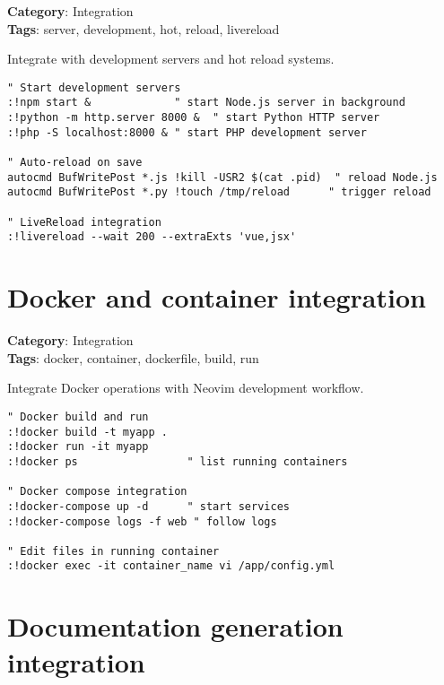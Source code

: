 {{{{{{\textbf{Category}: Integration\\ \textbf{Tags}: server, development, hot, reload, livereload
\vspace{0.5cm}

Integrate with development servers and hot reload systems.

\begin{Exa*}{}
\begin{Verbatim}[fontsize=\footnotesize, breaklines, breakanywhere]
" Start development servers
:!npm start &             " start Node.js server in background
:!python -m http.server 8000 &  " start Python HTTP server
:!php -S localhost:8000 & " start PHP development server

" Auto-reload on save
autocmd BufWritePost *.js !kill -USR2 $(cat .pid)  " reload Node.js
autocmd BufWritePost *.py !touch /tmp/reload      " trigger reload

" LiveReload integration
:!livereload --wait 200 --extraExts 'vue,jsx'
\end{Verbatim}
\end{Exa*}

\section{Docker and container integration}

\textbf{Category}: Integration\\ \textbf{Tags}: docker, container, dockerfile, build, run
\vspace{0.5cm}

Integrate Docker operations with Neovim development workflow.

\begin{Exa*}{}
\begin{Verbatim}[fontsize=\footnotesize, breaklines, breakanywhere]
" Docker build and run
:!docker build -t myapp .
:!docker run -it myapp
:!docker ps                 " list running containers

" Docker compose integration
:!docker-compose up -d      " start services
:!docker-compose logs -f web " follow logs

" Edit files in running container
:!docker exec -it container_name vi /app/config.yml
\end{Verbatim}
\end{Exa*}

\section{Documentation generation integration}

}}}}}}
